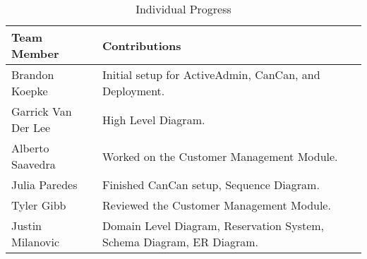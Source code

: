 \begin{table}[!ht]
	\begin{tabular}{|l|p{11cm}|}
		\hline
		\textbf{Team Member} & \textbf{Contributions} \\
		\hline
		Brandon Koepke & Initial setup for ActiveAdmin, CanCan, and Deployment. \\
		\hline
		Garrick Van Der Lee & High Level Diagram. \\
		\hline
		Alberto Saavedra & Worked on the Customer Management Module. \\
		\hline
		Julia Paredes & Finished CanCan setup, Sequence Diagram. \\
		\hline
		Tyler Gibb & Reviewed the Customer Management Module. \\
		\hline
		Justin Milanovic & Domain Level Diagram, Reservation System, Schema Diagram, ER Diagram. \\
		\hline
	\end{tabular}
	\caption{Individual Progress}
\end{table}

